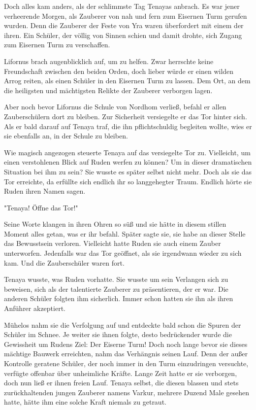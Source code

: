 \documentclass[10pt, a4paper, oneside]{book}
\begin{document}
\begin{multicols}{2}
Doch alles kam anders, als der schlimmste Tag Tenayas anbrach. Es war jener verheerende Morgen, als Zauberer von nah und fern zum Eisernen Turm gerufen wurden. Denn die Zauberer der Feste von Yra waren überfordert mit einem der ihren. Ein Schüler, der völlig von Sinnen schien und damit drohte, sich Zugang zum Eisernen Turm zu verschaffen.

Lifornus brach augenblicklich auf, um zu helfen. Zwar herrschte keine Freundschaft zwischen den beiden Orden, doch lieber würde er einen wilden Arrog reiten, als einen Schüler in den Eisernen Turm zu lassen. Dem Ort, an dem die heiligsten und mächtigsten Relikte der Zauberer verborgen lagen.

Aber noch bevor Lifornus die Schule von Nordhom verließ, befahl er allen Zauberschülern dort zu bleiben. Zur Sicherheit versiegelte er das Tor hinter sich. Als er bald darauf auf Tenaya traf, die ihn pflichtschuldig begleiten wollte, wies er sie ebenfalls an, in der Schule zu bleiben.

Wie magisch angezogen steuerte Tenaya auf das versiegelte Tor zu. Vielleicht, um einen verstohlenen Blick auf Ruden werfen zu können? Um in dieser dramatischen Situation bei ihm zu sein? Sie wusste es später selbst nicht mehr. Doch als sie das Tor erreichte, da erfüllte sich endlich ihr so langgehegter Traum. Endlich hörte sie Ruden ihren Namen sagen.

"Tenaya! Öffne das Tor!"

Seine Worte klangen in ihren Ohren so süß und sie hätte in diesem stillen Moment alles getan, was er ihr befahl. Später sagte sie, sie habe an dieser Stelle das Bewusstsein verloren. Vielleicht hatte Ruden sie auch einem Zauber unterworfen. Jedenfalls war das Tor geöffnet, als sie irgendwann wieder zu sich kam. Und die Zauberschüler waren fort.

Tenaya wusste, was Ruden vorhatte. Sie wusste um sein Verlangen sich zu beweisen, sich als der talentierte Zauberer zu präsentieren, der er war. Die anderen Schüler folgten ihm sicherlich. Immer schon hatten sie ihn als ihren Anführer akzeptiert.

Mühelos nahm sie die Verfolgung auf und entdeckte bald schon die Spuren der Schüler im Schnee. Je weiter sie ihnen folgte, desto bedrückender wurde die Gewissheit um Rudens Ziel: Der Eiserne Turm! Doch noch lange bevor sie dieses mächtige Bauwerk erreichten, nahm das Verhängnis seinen Lauf. Denn der außer Kontrolle geratene Schüler, der noch immer in den Turm einzudringen versuchte, verfügte offenbar über unheimliche Kräfte. Lange Zeit hatte er sie verborgen, doch nun ließ er ihnen freien Lauf. Tenaya selbst, die diesen blassen und stets zurückhaltenden jungen Zauberer namens Varkur, mehrere Duzend Male gesehen hatte, hätte ihm eine solche Kraft niemals zu getraut.


\end{multicols}
\end{document}
